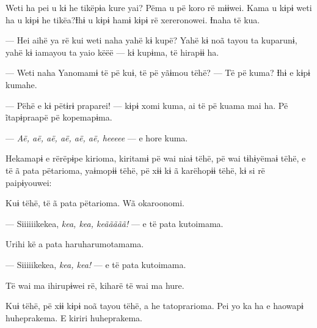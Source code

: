 Weti ha pei u kɨ he tikëpɨa kure yai? Pëma u pë koro rë mɨɨwei. Kama u
kɨpɨ weti ha u kɨpɨ he tikëa?Ɨhɨ u kɨpɨ hamɨ kɨpɨ rë xereronowei. Ɨnaha
të kua. 


--- Hei aihë ya rë kui weti naha yahë kɨ kupë? Yahë kɨ noã tayou ta
kuparunɨ, yahë kɨ iamayou ta yaio këëë --- kɨ kupɨma, të hirapɨɨ ha. 

--- Weti naha Yanomamɨ të pë kuɨ, të pë yãɨmou tëhë? --- Të pë kuma? Ɨhɨ
e kɨpɨ kumahe. 

--- Pëhë e kɨ pëtɨrɨ praparei! --- kɨpɨ xomi kuma, ai të pë kuama mai
ha. Pë ĩtapɨpraapë pë kopemapɨma. 

--- \textit{Aë, aë, aë, aë, aë, aë, heeeee} --- e hore kuma. 


Hekamapɨ e rërëpɨpe kirioma, kiritamɨ pë wai niaɨ tëhë, pë wai tɨhɨyëmaɨ
tëhë, e të ã pata pëtarioma, yaɨmopɨɨ tëhë, pë xɨɨ kɨ ã karëhopɨɨ tëhë,
kɨ si rë paipɨyouwei: 


Kuɨ tëhë, të ã pata pëtarioma. Wã okaroonomi. 

--- Siiiiiikekea, \textit{kea, kea, keããããã!} --- e të pata kutoimama. 

Urihi kë a pata haruharumotamama. 

--- Siiiiikekea, \textit{kea, kea!} --- e të pata kutoimama. 

Të wai ma ihirupɨwei rë, kiharë të wai ma hure. 

Kuɨ tëhë, pë xɨɨ kɨpɨ noã tayou tëhë, a he tatoprarioma. Pei yo ka ha e
haowapɨ huheprakema. E kiriri huheprakema. 

